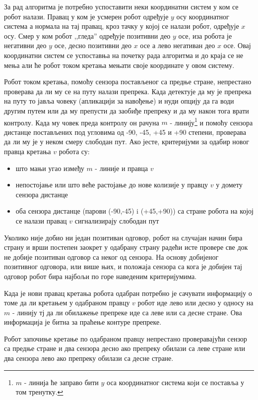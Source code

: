 \documentclass[12pt,oneside]{memoir}
\theoremstyle{remark}
\begin{document}
За рад алгоритма је потребно успоставити неки координатни систем у ком се робот налази. Правац у ком је усмерен робот одређује $y$ осу координатног система а нормала на тај правац, кроз тачку у којој се налази робот, одређује $x$ осу. Смер у ком робот ,,гледа'' одређује позитивни део $y$ осе, иза робота је негативни део $y$ осе, десно позитивни део $x$ осе а лево негативан део $x$ осе. Овај координатни систем се успоставња на почетку рада алгоритма и до краја се не мења али ће робот током кретања мењати своје координате у овом систему.

Робот током кретања, помоћу сензора постављеног са предње стране, непрестано проверава да ли му се на путу налази препрека. Када детектује да му је препрека на путу то јавља човеку (апликацији за навођење) и нуди опцију да га води другим путем или да му препусти да заобиђе препреку и да му након тога врати контролу. Када му човек преда контролу он рачуна $m$ - линију\footnote{$m$ - линија ће заправо бити $y$ оса координатног система који се поставља у том тренутку.} и помоћу сензора дистанце постављених под угловима од -90, -45, +45 и +90 степени, проверава да ли му је у неком смеру слободан пут. Ако јесте, критеријуми за одабир новог правца кретања $v$ робота су:
\begin{itemize}
\item што мањи угао између $m$ - линије и правца $v$
\item непостојање или што веће растојање до нове колизије у правцу $v$ у домету сензора дистанце
\item оба сензора дистанце (парови (-90,-45) i (+45,+90)) са стране робота на којој се налази правац $v$  сигнализирају слободан пут
\end{itemize}

Уколико није добио ни један позитиван одговор, робот на случајан начин бира страну и врши постепен заокрет у одабрану страну радећи исте провере све док не добије позитиван одговор са неког од сензора. На основу добијеног позитивног одговора, или више њих, и положаја сензора са кога је добијен тај одговор робот бира најбољи по горе наведеним критеријумима.

Када је нови правац кретања робота одабран потребно је сачувати информацију о томе да ли кретањем у одабраном правцу $v$ робот иде лево или десно у односу на $m$ - линију тј да ли обилажење препреке иде са леве или са десне стране. Ова информација је битна за праћење контуре препреке.

Робот започиње кретање по одабраном правцу непрестано проверавајући сензор са предње стране и два сензора десно ако препреку обилази са леве стране или два сензора лево ако препреку обилази са десне стране. 
\end{document}
